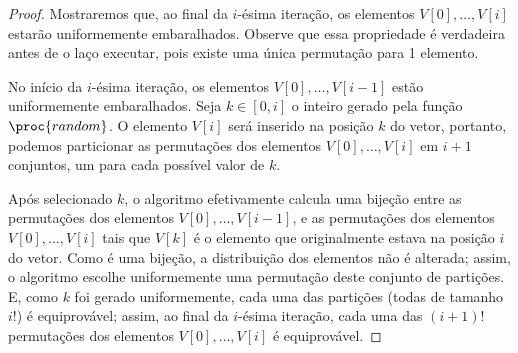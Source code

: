 \begin{proof}
    Mostraremos que, ao final da $i$-ésima iteração,
    os elementos $V[0], \dots, V[i]$
    estarão uniformemente embaralhados.
    Observe que essa propriedade é verdadeira antes de o laço executar,
    pois existe uma única permutação para 1 elemento.

    No início da $i$-ésima iteração,
    os elementos $V[0], \dots, V[i-1]$
    estão uniformemente embaralhados.
    Seja $k \in [0, i]$ o inteiro gerado pela função $\proc{random}$.
    O elemento $V[i]$ será inserido na posição $k$ do vetor,
    portanto,
    podemos particionar as permutações dos elementos $V[0], \dots, V[i]$
    em $i+1$ conjuntos,
    um para cada possível valor de $k$.

    Após selecionado $k$,
    o algoritmo efetivamente calcula uma bijeção entre
    as permutações dos elementos $V[0], \dots, V[i-1]$,
    e as permutações dos elementos $V[0], \dots, V[i]$ tais que 
    $V[k]$ é o elemento que originalmente estava na posição $i$ do vetor.
    Como é uma bijeção,
    a distribuição dos elementos não é alterada;
    assim, o algoritmo escolhe uniformemente uma permutação
    deste conjunto de partições.
    E, como $k$ foi gerado uniformemente,
    cada uma das partições (todas de tamanho $i!$) é equiprovável;
    assim, ao final da $i$-ésima iteração,
    cada uma das $(i+1)!$ permutações dos elementos $V[0], \dots, V[i]$
    é equiprovável.
\end{proof}
